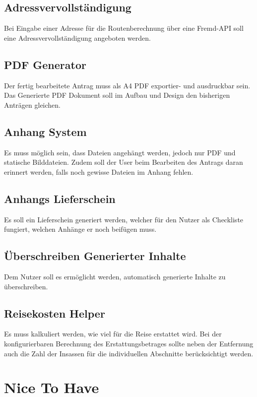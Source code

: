 \subsection{Adressvervollständigung}\label{subsec:adressvervollstandigung}
Bei Eingabe einer Adresse für die Routenberechnung über eine Fremd-\ac{API} soll eine Adressvervollständigung angeboten werden.
\subsection{\ac{PDF} Generator}\label{subsec:pdf-generator}
Der fertig bearbeitete Antrag muss als A4 \ac{PDF} exportier- und ausdruckbar sein.
Das Generierte \ac{PDF} Dokument soll im Aufbau und Design den bisherigen Anträgen gleichen.
\subsection{Anhang System}\label{subsec:anhang-system}
Es muss möglich sein, dass Dateien angehängt werden, jedoch nur \ac{PDF} und statische Bilddateien.
Zudem soll der User beim Bearbeiten des Antrags daran erinnert werden, falls noch gewisse Dateien im Anhang fehlen.
\subsection{Anhangs Lieferschein}\label{subsec:anhangs-lieferschein}
Es soll ein Lieferschein generiert werden, welcher für den Nutzer als Checkliste fungiert, welchen Anhänge er noch beifügen muss.
\subsection{Überschreiben Generierter Inhalte}\label{subsec:uberschreiben-generierter-inhalte}
Dem Nutzer soll es ermöglicht werden, automatisch generierte Inhalte zu überschreiben.
\subsection{Reisekosten Helper}\label{subsec:reisekosten-helper}
Es muss kalkuliert werden, wie viel für die Reise erstattet wird.
Bei der konfigurierbaren Berechnung des Erstattungsbetrages sollte neben der Entfernung auch die Zahl der Insassen für
die individuellen Abschnitte berücksichtigt werden.

\section{Nice To Have}\label{sec:nice-to-have}
